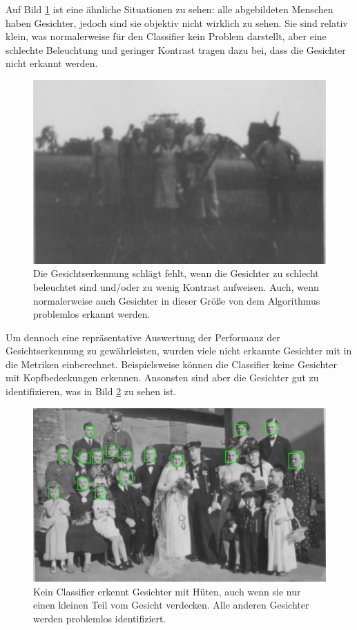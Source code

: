 Auf Bild \ref{fig:neg_ex2} ist eine ähnliche Situationen zu sehen: alle abgebildeten Menschen haben Gesichter, jedoch sind sie objektiv nicht wirklich zu sehen. Sie sind relativ klein, was normalerweise für den Classifier kein Problem darstellt, aber eine schlechte Beleuchtung und geringer Kontrast tragen dazu bei, dass die Gesichter nicht erkannt werden.\\
\begin{figure}[h]
	\centering
	\includegraphics[width=0.75\linewidth]{images/examples_groundtruth/negative/29_2.png}
	\caption{Die Gesichtserkennung schlägt fehlt, wenn die Gesichter zu schlecht beleuchtet sind und/oder zu wenig Kontrast aufweisen. Auch, wenn normalerweise auch Gesichter in dieser Größe von dem Algorithmus problemlos erkannt werden.}
	\label{fig:neg_ex2}
\end{figure}
Um dennoch eine repräsentative Auswertung der Performanz der Gesichtserkennung zu gewährleisten, wurden viele nicht erkannte Gesichter mit in die Metriken einberechnet. Beispielsweise können die Classifier keine Gesichter mit Kopfbedeckungen erkennen. Ansonsten sind aber die Gesichter gut zu identifizieren, was in Bild \ref{fig:pos_ex1} zu sehen ist.\\
\begin{figure}[h]
	\centering
	\includegraphics[width=0.75\linewidth]{images/examples_groundtruth/positive/32_3.png}
	\caption{Kein Classifier erkennt Gesichter mit Hüten, auch wenn sie nur einen kleinen Teil vom Gesicht verdecken. Alle anderen Gesichter werden problemlos identifiziert.}
	\label{fig:pos_ex1}
\end{figure}
